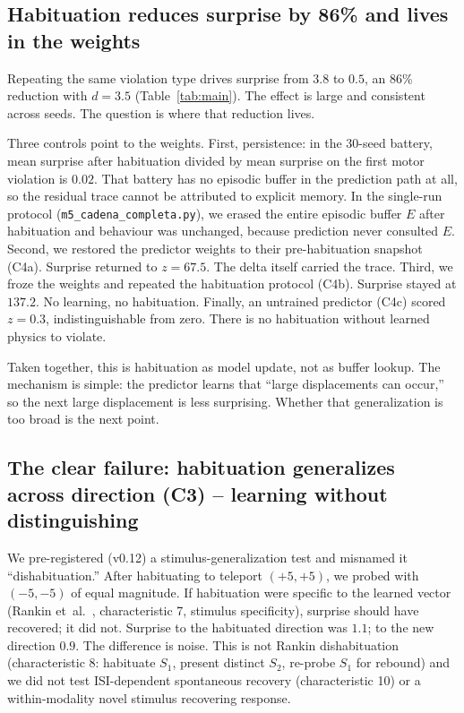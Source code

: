 \documentclass[11pt,a4paper]{article}
\begin{document}
\subsection{Habituation reduces surprise by 86\% and lives in the weights}

Repeating the same violation type drives surprise from $3.8$ to $0.5$, an 86\% reduction with $d=3.5$ (Table~\ref{tab:main}). The effect is large and consistent across seeds. The question is where that reduction lives.

Three controls point to the weights. First, persistence: in the 30-seed battery, mean surprise after habituation divided by mean surprise on the first motor violation is $0.02$. That battery has no episodic buffer in the prediction path at all, so the residual trace cannot be attributed to explicit memory. In the single-run protocol (\texttt{m5\_cadena\_completa.py}), we erased the entire episodic buffer $E$ after habituation and behaviour was unchanged, because prediction never consulted $E$. Second, we restored the predictor weights to their pre-habituation snapshot (C4a). Surprise returned to $z=67.5$. The delta itself carried the trace. Third, we froze the weights and repeated the habituation protocol (C4b). Surprise stayed at $137.2$. No learning, no habituation. Finally, an untrained predictor (C4c) scored $z=0.3$, indistinguishable from zero. There is no habituation without learned physics to violate.

Taken together, this is habituation as model update, not as buffer lookup. The mechanism is simple: the predictor learns that ``large displacements can occur,'' so the next large displacement is less surprising. Whether that generalization is too broad is the next point.

\subsection{The clear failure: habituation generalizes across direction (C3) -- learning without distinguishing}

We pre-registered (v0.12) a stimulus-generalization test and misnamed it ``dishabituation.'' After habituating to teleport $(+5,+5)$, we probed with $(-5,-5)$ of equal magnitude. If habituation were specific to the learned vector (Rankin et~al.~\cite{rankin2009}, characteristic 7, stimulus specificity), surprise should have recovered; it did not. Surprise to the habituated direction was $1.1$; to the new direction $0.9$. The difference is noise. This is not Rankin dishabituation (characteristic 8: habituate $S_1$, present distinct $S_2$, re-probe $S_1$ for rebound) and we did not test ISI-dependent spontaneous recovery (characteristic 10) or a within-modality novel stimulus recovering response.
\end{document}
